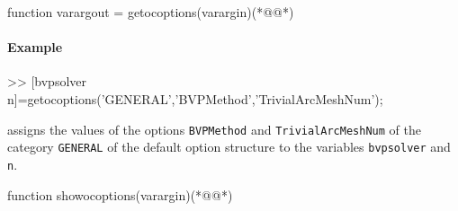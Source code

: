 \begin{matlab}
function varargout = getocoptions(varargin)(*@@*)
%
%
%
%
%
%
\end{matlab}
\paragraph{Example}
\begin{matlab}
>> [bvpsolver n]=getocoptions('GENERAL','BVPMethod','TrivialArcMeshNum');
\end{matlab}
assigns the values of the options \lstinline+BVPMethod+ and \lstinline+TrivialArcMeshNum+ of the category \lstinline+GENERAL+ of the default option structure to the variables \lstinline+bvpsolver+ and \lstinline+n+.
\begin{matlab}
function showocoptions(varargin)(*@@*)
%
%
%
% 
%
\end{matlab}
